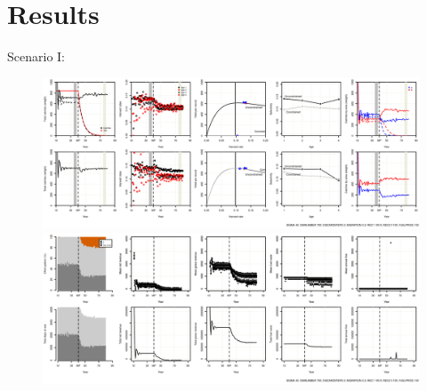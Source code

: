 \documentclass[12pt,oneline,a4paper,numbib]{ouparticle}
\numberwithin{equation}{subsection} %
\begin{document}

\section{Results}
\label{sec3}

\newpage
Scenario I:
\begin{figure}[!h]
\centering
\begin{minipage}{.45\textwidth}
\includegraphics[width=0.9\textheight, angle=90]{Figures/Catch_LO_disc_YieldLand.eps} 
\end{minipage}
\hfill
\begin{minipage}{.45\textwidth}
\includegraphics[width=0.9\textheight, angle=90]{Figures/Effort_LO_disc_YieldLand.eps} 
\end{minipage}
\caption{}
\end{figure}

\end{document}
